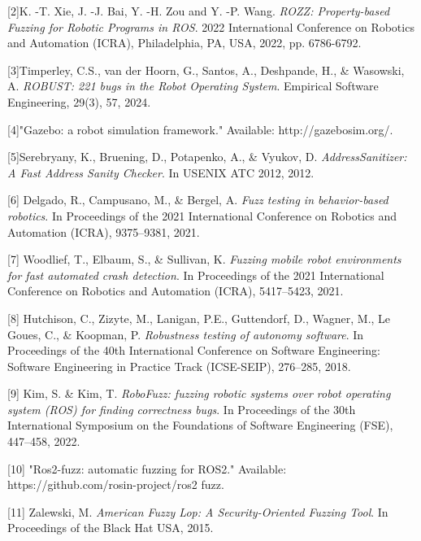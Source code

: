 \documentclass[zihao=-4]{ctexart}
\begin{document}
[2]K. -T. Xie, J. -J. Bai, Y. -H. Zou and Y. -P. Wang. \textit{ROZZ: Property-based Fuzzing for Robotic Programs in ROS}. 2022 International Conference on Robotics and Automation (ICRA), Philadelphia, PA, USA, 2022, pp. 6786-6792.

[3]Timperley, C.S., van der Hoorn, G., Santos, A., Deshpande, H., \& Wasowski, A. \textit{ROBUST: 221 bugs in the Robot Operating System}. Empirical Software Engineering, 29(3), 57, 2024.

[4]"Gazebo: a robot simulation framework." Available: http://gazebosim.org/.

[5]Serebryany, K., Bruening, D., Potapenko, A., \& Vyukov, D. \textit{AddressSanitizer: A Fast Address Sanity Checker}. In USENIX ATC 2012, 2012.

[6] Delgado, R., Campusano, M., \& Bergel, A. \textit{Fuzz testing in behavior-based robotics}. In Proceedings of the 2021 International Conference on Robotics and Automation (ICRA), 9375–9381, 2021.

[7] Woodlief, T., Elbaum, S., \& Sullivan, K. \textit{Fuzzing mobile robot environments for fast automated crash detection}. In Proceedings of the 2021 International Conference on Robotics and Automation (ICRA), 5417–5423, 2021.

[8] Hutchison, C., Zizyte, M., Lanigan, P.E., Guttendorf, D., Wagner, M., Le Goues, C., \& Koopman, P. \textit{Robustness testing of autonomy software}. In Proceedings of the 40th International Conference on Software Engineering: Software Engineering in Practice Track (ICSE-SEIP), 276–285, 2018.

[9] Kim, S. \& Kim, T. \textit{RoboFuzz: fuzzing robotic systems over robot operating system (ROS) for finding correctness bugs}. In Proceedings of the 30th International Symposium on the Foundations of Software Engineering (FSE), 447–458, 2022.

[10] "Ros2-fuzz: automatic fuzzing for ROS2." Available: https://github.com/rosin-project/ros2 fuzz.

[11] Zalewski, M. \textit{American Fuzzy Lop: A Security-Oriented Fuzzing Tool}. In Proceedings of the Black Hat USA, 2015.


% 
\end{document}
